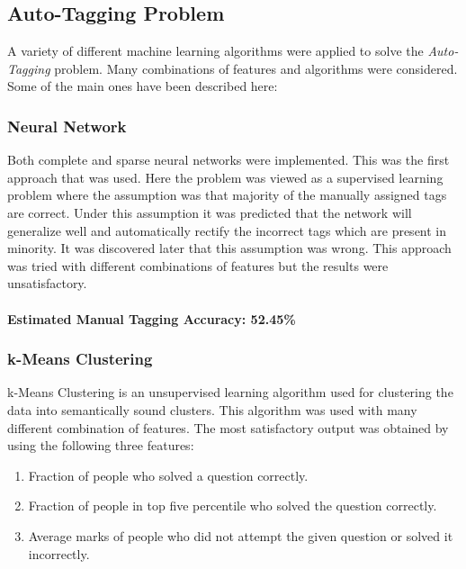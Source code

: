 \documentclass[12pt]{article}
\begin{document}
	\subsection{Auto-Tagging Problem}
	A variety of different machine learning algorithms were applied to 
	solve the \textit{Auto-Tagging} problem. Many combinations of features
	and algorithms were considered. Some of the main ones have been described
	here:
	
	\subsubsection{Neural Network}
	Both complete and sparse neural networks were implemented. This was
	the first approach that was used. Here the problem was viewed as a 
	supervised learning problem where the assumption was that majority of
	the manually assigned tags are correct. Under this assumption it was
	predicted that the network will generalize well and automatically rectify
	the incorrect tags which are present in minority.
	It was discovered later that this assumption was wrong. This approach
	was tried with different combinations of features but the results were
	unsatisfactory. 
	
	\paragraph{Estimated Manual Tagging Accuracy: 52.45\%}
	
	
	\subsubsection{k-Means Clustering}
	k-Means Clustering is an unsupervised learning algorithm used for
	clustering the data into semantically sound clusters. This algorithm
	was used with many different combination of features. The most satisfactory
	output was obtained by using the following three features:
	\begin{enumerate}
	\item Fraction of people who solved a question correctly.
	\item Fraction of people in top five percentile who solved the question
	correctly.
	\item Average marks of people who did not attempt the given question or
	solved it incorrectly.
	\end{enumerate}
	
\end{document}
